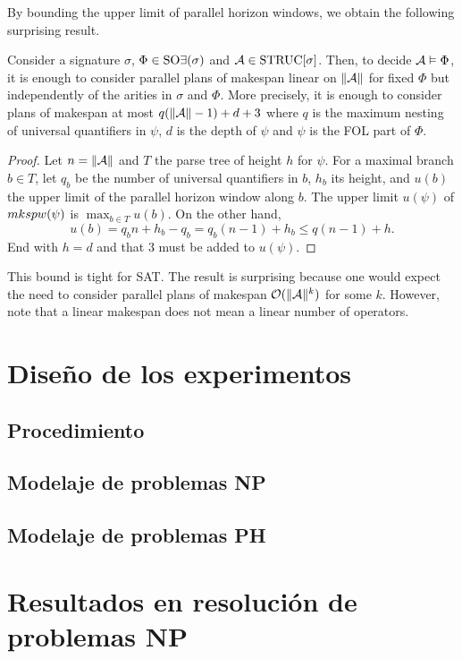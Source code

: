 By bounding the upper limit of parallel horizon 
windows, we obtain the following surprising result.

\begin{theorem}
Consider a signature $\sigma$, $\Phi\in\text{SO}\exists(\sigma)$ and
$\mathcal{A}\in\text{STRUC}[\sigma]$. Then, to decide $\mathcal{A}\vDash\Phi$,
it is enough to consider parallel plans of makespan
linear on $\|\mathcal{A}\|$ for fixed $\Phi$ but independently
of the arities in $\sigma$ and $\Phi$.
More precisely, it is enough to consider plans of makespan
at most $q(\|\mathcal{A}\|-1)+d+3$ where $q$ is the maximum nesting
of universal quantifiers in $\psi$, $d$ is the depth of
$\psi$ and $\psi$ is the FOL part of $\Phi$.
\end{theorem}
\begin{proof}
Let $n=\|\mathcal{A}\|$ and $T$ the parse tree of height $h$ for $\psi$.
For a maximal branch $b\in T$, let $q_b$ be the number
of universal quantifiers in $b$, $h_b$ its height, and
$u(b)$ the upper limit of the parallel horizon window
along $b$. The upper limit $u(\psi)$ of $mkspw(\psi)$
is $\max_{b\in T} u(b)$. On the other hand,
\[ u(b) = q_bn + h_b - q_b = q_b(n-1) + h_b \leq q(n-1) + h. \]
End with $h=d$ and that $3$ must be added to $u(\psi)$.
\end{proof}

This bound is tight for SAT.
The result is surprising because one would expect 
the need to consider parallel plans of makespan $\mathcal{O}(\|\mathcal{A}\|^k)$
for some $k$. However, note that a linear makespan
does not mean a linear number of operators.

\section{Diseño de los experimentos}
\subsection{Procedimiento}

\subsection{Modelaje de problemas NP}

\subsection{Modelaje de problemas PH}

\section{Resultados en resolución de problemas NP}

